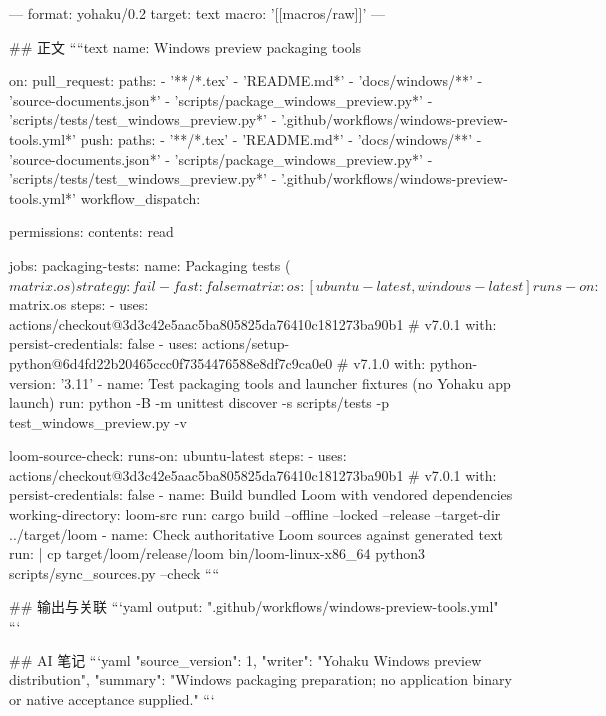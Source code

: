 ---
format: yohaku/0.2
target: text
macro: '[[macros/raw]]'
---

## 正文
````text
name: Windows preview packaging tools

on:
  pull_request:
    paths:
      - '**/*.tex'
      - 'README.md*'
      - 'docs/windows/**'
      - 'source-documents.json*'
      - 'scripts/package_windows_preview.py*'
      - 'scripts/tests/test_windows_preview.py*'
      - '.github/workflows/windows-preview-tools.yml*'
  push:
    paths:
      - '**/*.tex'
      - 'README.md*'
      - 'docs/windows/**'
      - 'source-documents.json*'
      - 'scripts/package_windows_preview.py*'
      - 'scripts/tests/test_windows_preview.py*'
      - '.github/workflows/windows-preview-tools.yml*'
  workflow_dispatch:

permissions:
  contents: read

jobs:
  packaging-tests:
    name: Packaging tests (${{ matrix.os }})
    strategy:
      fail-fast: false
      matrix:
        os: [ubuntu-latest, windows-latest]
    runs-on: ${{ matrix.os }}
    steps:
      - uses: actions/checkout@3d3c42e5aac5ba805825da76410c181273ba90b1 # v7.0.1
        with:
          persist-credentials: false
      - uses: actions/setup-python@6d4fd22b20465ccc0f7354476588e8df7c9ca0e0 # v7.1.0
        with:
          python-version: '3.11'
      - name: Test packaging tools and launcher fixtures (no Yohaku app launch)
        run: python -B -m unittest discover -s scripts/tests -p test_windows_preview.py -v

  loom-source-check:
    runs-on: ubuntu-latest
    steps:
      - uses: actions/checkout@3d3c42e5aac5ba805825da76410c181273ba90b1 # v7.0.1
        with:
          persist-credentials: false
      - name: Build bundled Loom with vendored dependencies
        working-directory: loom-src
        run: cargo build --offline --locked --release --target-dir ../target/loom
      - name: Check authoritative Loom sources against generated text
        run: |
          cp target/loom/release/loom bin/loom-linux-x86_64
          python3 scripts/sync_sources.py --check
````

## 输出与关联
```yaml
output: ".github/workflows/windows-preview-tools.yml"
```

## AI 笔记
```yaml
{"source_version": 1, "writer": "Yohaku Windows preview distribution", "summary": "Windows packaging preparation; no application binary or native acceptance supplied."}
```
